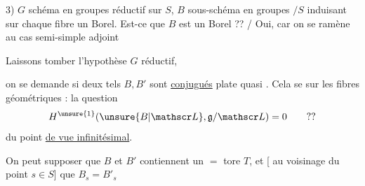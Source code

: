 \usetikzlibrary{shapes.geometric}
3) $G$ schéma en groupes réductif sur $S$, $B$ sous-schéma en groupes $/S$ induisant sur chaque fibre un Borel. Est-ce que $B$ est un Borel ?? / Oui, car on se ramène au cas semi-simple adjoint


Laissons tomber l'hypothèse $G$ réductif,

 on se demande si deux tels $B,B'$ sont  \uline{conjugués}    plate quasi . Cela se  sur les fibres géométriques : la question
\[
H^{\unsure{1}}(\unsure{B|\mathscr L},\mathfrak g/\mathscr L)=0\qquad??
\]
du point \uline{de vue infinitésimal}.

On peut supposer que $B$ et $B'$ contiennent un $=$ tore $T$, et [  au voisinage du point $s\in S$] que $B_s=B'_s$
